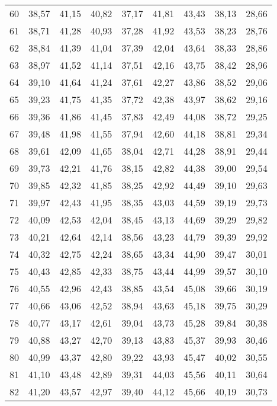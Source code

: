 \begin{longtable}{c c c c c c c c c}
      60	& 38,57	& 41,15	& 40,82	& 37,17	& 41,81	& 43,43	& 38,13	& 28,66 \\
      61	& 38,71	& 41,28	& 40,93	& 37,28	& 41,92	& 43,53	& 38,23	& 28,76 \\
      62	& 38,84	& 41,39	& 41,04	& 37,39	& 42,04	& 43,64	& 38,33	& 28,86 \\
      63	& 38,97	& 41,52	& 41,14	& 37,51	& 42,16	& 43,75	& 38,42	& 28,96 \\
      64	& 39,10	& 41,64	& 41,24	& 37,61	& 42,27	& 43,86	& 38,52	& 29,06 \\
      65	& 39,23	& 41,75	& 41,35	& 37,72	& 42,38	& 43,97	& 38,62	& 29,16 \\
      66	& 39,36	& 41,86	& 41,45	& 37,83	& 42,49	& 44,08	& 38,72	& 29,25 \\
      67	& 39,48	& 41,98	& 41,55	& 37,94	& 42,60	& 44,18	& 38,81	& 29,34 \\
      68	& 39,61	& 42,09	& 41,65	& 38,04	& 42,71	& 44,28	& 38,91	& 29,44 \\
      69	& 39,73	& 42,21	& 41,76	& 38,15	& 42,82	& 44,38	& 39,00	& 29,54 \\
      70	& 39,85	& 42,32	& 41,85	& 38,25	& 42,92	& 44,49	& 39,10	& 29,63 \\
      71	& 39,97	& 42,43	& 41,95	& 38,35	& 43,03	& 44,59	& 39,19	& 29,73 \\
      72	& 40,09	& 42,53	& 42,04	& 38,45	& 43,13	& 44,69	& 39,29	& 29,82 \\
      73	& 40,21	& 42,64	& 42,14	& 38,56	& 43,23	& 44,79	& 39,39	& 29,92 \\
      74	& 40,32	& 42,75	& 42,24	& 38,65	& 43,34	& 44,90	& 39,47	& 30,01 \\
      75	& 40,43	& 42,85	& 42,33	& 38,75	& 43,44	& 44,99	& 39,57	& 30,10 \\
      76	& 40,55	& 42,96	& 42,43	& 38,85	& 43,54	& 45,08	& 39,66	& 30,19 \\
      77	& 40,66	& 43,06	& 42,52	& 38,94	& 43,63	& 45,18	& 39,75	& 30,29 \\
      78	& 40,77	& 43,17	& 42,61	& 39,04	& 43,73	& 45,28	& 39,84	& 30,38 \\
      79	& 40,88	& 43,27	& 42,70	& 39,13	& 43,83	& 45,37	& 39,93	& 30,46 \\
      80	& 40,99	& 43,37	& 42,80	& 39,22	& 43,93	& 45,47	& 40,02	& 30,55 \\
      81	& 41,10	& 43,48	& 42,89	& 39,31	& 44,03	& 45,56	& 40,11	& 30,64 \\
      82	& 41,20	& 43,57	& 42,97	& 39,40	& 44,12	& 45,66	& 40,19	& 30,73 \\

\end{longtable}
